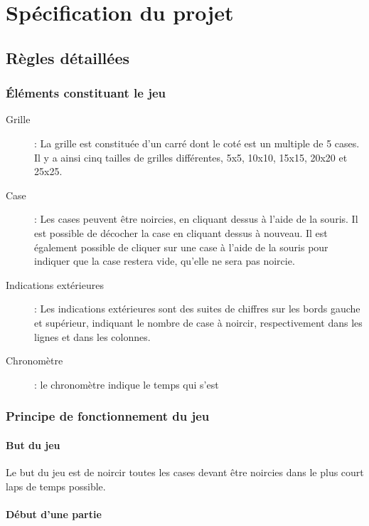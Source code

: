 \documentclass[11pt]{article}
\begin{document}
\section{Spécification du projet}

\subsection{Règles détaillées}

\subsubsection{Éléments constituant le jeu}

    \begin{description}
        \item[Grille] : La grille est constituée d'un carré dont le coté est un multiple de 5 cases. Il y a ainsi cinq tailles de grilles différentes, 5x5, 10x10, 15x15, 20x20 et 25x25.
        \item[Case] : Les cases peuvent être noircies, en cliquant dessus à l'aide de la souris. Il est possible de décocher la case en cliquant dessus à nouveau. Il est également possible de cliquer sur une case à l'aide de la souris pour indiquer que la case restera vide, qu'elle ne sera pas noircie.
        \item[Indications extérieures] : Les indications extérieures sont des suites de chiffres sur les bords gauche et supérieur, indiquant le nombre de case à noircir, respectivement dans les lignes et dans les colonnes.
        \item[Chronomètre] : le chronomètre indique le temps qui s'est
    \end{description}

\subsubsection{Principe de fonctionnement du jeu}

\paragraph{But du jeu}
Le but du jeu est de noircir toutes les cases devant être noircies dans le plus court laps de temps possible.

\paragraph{Début d'une partie}
\end{document}
